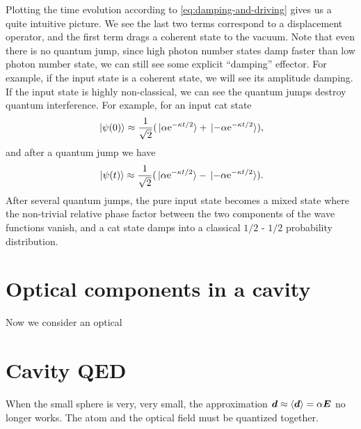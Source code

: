 \documentclass[hyperref, a4paper]{article}
\newcommand*{\ee}{\mathrm{e}}
\begin{document}
Plotting the time evolution according to \eqref{eq:damping-and-driving} gives us a quite intuitive picture.
We see the last two terms correspond to a displacement operator, and the first term drags a coherent state 
to the vacuum. Note that even there is no quantum jump, since high photon number states damp faster than 
low photon number state, we can still see some explicit ``damping'' effector. For example, if the input 
state is a coherent state, we will see its amplitude damping.
If the input state is highly non-classical, we can see the quantum jumps destroy quantum interference.
For example, for an input cat state 
\[
    \ket*{\psi(0)} \approx \frac{1}{\sqrt{2}} (\ket*{\alpha \ee^{- \kappa t / 2}} + \ket*{- \alpha \ee^{- \kappa t / 2}}),
\]
and after a quantum jump we have 
\[
    \ket*{\psi(t)} \approx \frac{1}{\sqrt{2}} (\ket*{\alpha \ee^{- \kappa t / 2}} - \ket*{- \alpha \ee^{- \kappa t / 2}}).
\]
After several quantum jumps, the pure input state becomes a mixed state where the non-trivial relative phase factor 
between the two components of the wave functions vanish, and a cat state damps into a classical $1/2$ - $1/2$ 
probability distribution.

\section{Optical components in a cavity}

Now we consider an optical 

\section{Cavity QED}

When the small sphere is very, very small, the approximation $\vb*{d} \approx \expval{\vb*{d}} = \alpha \vb*{E}$
no longer works. The atom and the optical field must be quantized together. 
\end{document}
